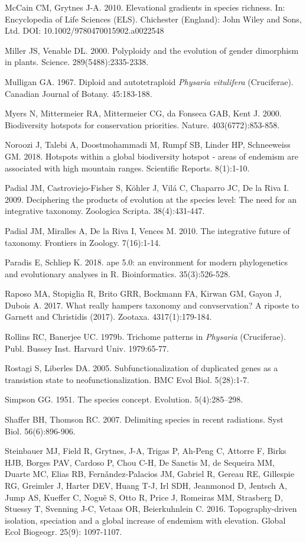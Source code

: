 McCain CM, Grytnes J-A. 2010. Elevational gradients in species richness. In: Encyclopedia of Life Sciences (ELS). Chichester (England): John Wiley and Sons, Ltd.  DOI: 10.1002/9780470015902.a0022548

Miller JS, Venable DL. 2000. Polyploidy and the evolution of gender dimorphism in plants. Science. 289(5488):2335-2338.

Mulligan GA. 1967. Diploid and autotetraploid \textit{Physaria vitulifera} (Cruciferae). Canadian Journal of Botany. 45:183-188.

Myers N, Mittermeier RA, Mittermeier CG, da Fonseca GAB, Kent J. 2000. Biodiversity hotspots for conservation priorities. Nature. 403(6772):853-858.

Noroozi J, Talebi A, Doostmohammadi M, Rumpf SB, Linder HP, Schneeweiss GM. 2018. Hotspots within a global biodiversity hotspot - areas of endemism are associated with high mountain ranges. Scientific Reports. 8(1):1-10.

Padial JM, Castroviejo-Fisher S, Köhler J, Vilá C, Chaparro JC, De la Riva I. 2009. Deciphering the products of evolution at the species level: The need for an integrative taxonomy. Zoologica Scripta. 38(4):431-447.

Padial JM, Miralles A, De la Riva I, Vences M. 2010. The integrative future of taxonomy. Frontiers in Zoology. 7(16):1-14.

Paradis E, Schliep K. 2018. ape 5.0: an environment for modern phylogenetics
and evolutionary analyses in R. Bioinformatics. 35(3):526-528.

Raposo MA, Stopiglia R, Brito GRR, Bockmann FA, Kirwan GM, Gayon J, Dubois A. 2017. What really hampers taxonomy and convservation? A riposte to Garnett and Christidis (2017). Zootaxa. 4317(1):179-184.

Rollins RC, Banerjee UC. 1979b. Trichome patterns in \textit{Physaria} (Cruciferae). Publ. Bussey Inst. Harvard Univ. 1979:65-77.

Rostagi S, Liberles DA. 2005. Subfunctionalization of duplicated genes as a transistion state to neofunctionalization. BMC Evol Biol. 5(28):1-7.

Simpson GG. 1951. The species concept. Evolution. 5(4):285–298.

Shaffer BH, Thomson RC. 2007. Delimiting species in recent radiations. Syst Biol. 56(6):896-906.

Steinbauer MJ, Field R, Grytnes, J-A, Trigas P, Ah-Peng C, Attorre F, Birks HJB, Borges PAV, Cardoso P, Chou C-H, De Sanctis M, de Sequeira MM,  Duarte MC, Elias RB, Fern\v{a}ndez-Palacios JM, Gabriel R, Gereau RE, Gillespie RG, Greimler J, Harter DEV, Huang T-J, Irl SDH, Jeanmonod D, Jentsch A, Jump AS, Kueffer C, Nogu\v{e} S, Otto R, Price J, Romeiras MM, Strasberg D, Stuessy T, Svenning J-C, Vetaas OR, Beierkuhnlein C. 2016. Topography-driven isolation, speciation and a global increase of endemism with elevation. Global Ecol Biogeogr. 25(9): 1097-1107.

